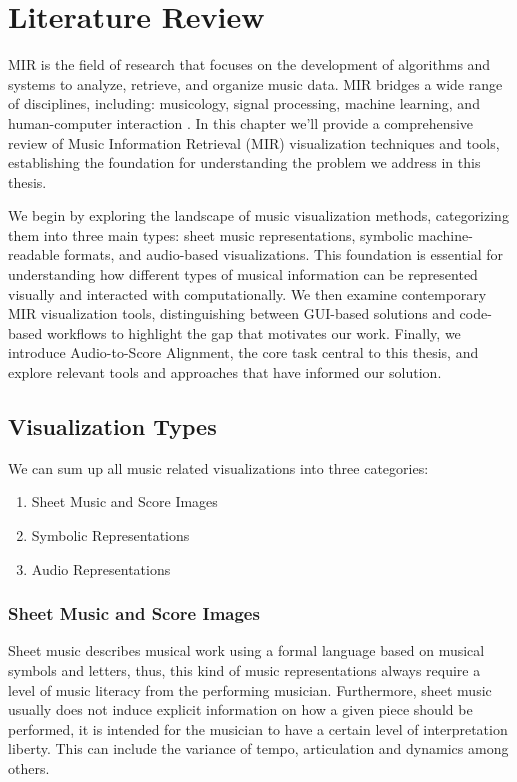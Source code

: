 \chapter{Literature Review} \label{chap:sota}
\ac{MIR} is the field of research that focuses on the development of algorithms and systems to analyze, retrieve, and organize music data. \ac{MIR} bridges a wide range of disciplines, including: musicology, signal processing, machine learning, and human-computer interaction \cite{mullerFundamentalsMusicProcessing2015}.
In this chapter we'll provide a comprehensive review of Music Information Retrieval (MIR) visualization techniques and tools, establishing the foundation for understanding the problem we address in this thesis. 

We begin by exploring the landscape of music visualization methods, categorizing them into three main types: sheet music representations, symbolic machine-readable formats, and audio-based visualizations. This foundation is essential for understanding how different types of musical information can be represented visually and interacted with computationally. We then examine contemporary MIR visualization tools, distinguishing between GUI-based solutions and code-based workflows to highlight the gap that motivates our work. Finally, we introduce Audio-to-Score Alignment, the core task central to this thesis, and explore relevant tools and approaches that have informed our solution.



\section{Visualization Types}

We can sum up all music related visualizations into three categories:
\begin{enumerate}
    \item Sheet Music and Score Images
    \item Symbolic Representations
    \item Audio Representations
\end{enumerate}

\subsection{Sheet Music and Score Images}

Sheet music describes musical work using a formal language based on musical symbols and letters, thus, this kind of music representations always require  a level of music literacy from the performing musician. Furthermore, sheet music usually does not induce explicit information on how a given piece should be performed, it is intended for the musician to have a certain level of interpretation liberty. This can include the variance of tempo, articulation and dynamics among others.

